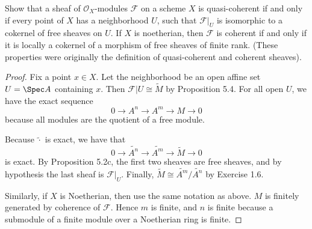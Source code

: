 \begin{exercise}%
	Show that a sheaf of $\mathscr{O}_X $-modules $\mathscr{F} $ on a scheme $X $ is quasi-coherent if and only if every point of $X $ has a neighborhood $U $, such that $\mathscr{F}|_U $ is isomorphic to a cokernel of free sheaves on $U $. If $X $ is noetherian, then $\mathscr{F} $ is coherent if and only if it is locally a cokernel of a morphism of free sheaves of finite rank. (These properties were originally the definition of quasi-coherent and coherent sheaves).
\end{exercise}
\begin{proof}
	Fix a point $x\in X $.
	Let the neighborhood be an open affine set $U = \Spec A $ containing $x $.
	Then $\mathscr{F}|U \cong \tilde{M} $ by Proposition 5.4.
	For all open $U $, we have the exact sequence
	\[
		0 \to A^{n} \to A^{m} \to M \to 0
	\] 
	because all modules are the quotient of a free module.

	Because $\tilde{\cdot}$ is exact, we have that
	\[
		0 \to \tilde{A^n} \to \tilde{A^m} \to \tilde{M} \to 0
	\] 
	is exact.
	By Proposition 5.2c, the first two sheaves are free sheaves, and by hypothesis the last sheaf is $\mathscr{F}|_U $.
	Finally, $\tilde{M} \cong \tilde{A^m} / \tilde{A^n} $ by Exercise 1.6.

	Similarly, if $X $ is Noetherian, then use the same notation as above.
	$M $ is finitely generated by coherence of $\mathscr{F} $.
	Hence $m $ is finite, and $n $ is finite because a submodule of a finite module over a Noetherian ring is finite.
\end{proof}

